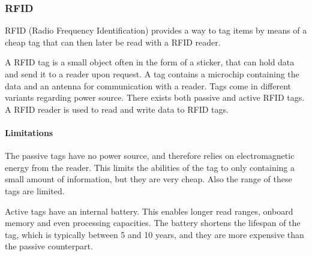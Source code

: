 \subsubsection{RFID}
RFID (Radio Frequency Identification) provides a way to tag items by means of a cheap tag that can then later be read with a RFID reader.

A RFID tag is a small object often in the form of a sticker, that can hold data and send it to a reader upon request.
A tag contains a microchip containing the data and an antenna for communication with a reader.
Tags come in different variants regarding power source.
There exists both passive and active RFID tags.\cite{rfidreview}
A RFID reader is used to read and write data to RFID tags.

\paragraph{Limitations}
The passive tags have no power source, and therefore relies on electromagnetic energy from the reader.
This limits the abilities of the tag to only containing a small amount of information, but they are very cheap.
Also the range of these tags are limited. \cite{rfidreview}

Active tags have an internal battery.
This enables longer read ranges, onboard memory and even processing capacities.
The battery shortens the lifespan of the tag, which is typically between 5 and 10 years, and they are more expensive than the passive counterpart. \cite{rfidreview}